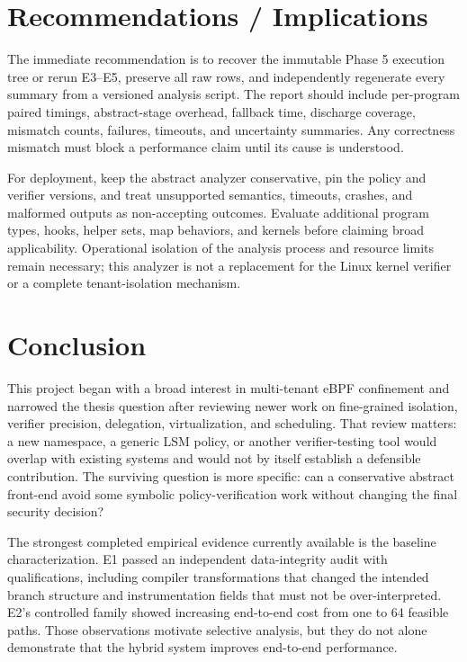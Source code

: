 \documentclass[12pt,a4paper]{article}
\begin{document}


\section{Recommendations / Implications}
The immediate recommendation is to recover the immutable Phase 5 execution tree or rerun E3--E5, preserve all raw rows, and independently regenerate every summary from a versioned analysis script. The report should include per-program paired timings, abstract-stage overhead, fallback time, discharge coverage, mismatch counts, failures, timeouts, and uncertainty summaries. Any correctness mismatch must block a performance claim until its cause is understood.

For deployment, keep the abstract analyzer conservative, pin the policy and verifier versions, and treat unsupported semantics, timeouts, crashes, and malformed outputs as non-accepting outcomes. Evaluate additional program types, hooks, helper sets, map behaviors, and kernels before claiming broad applicability. Operational isolation of the analysis process and resource limits remain necessary; this analyzer is not a replacement for the Linux kernel verifier or a complete tenant-isolation mechanism.

\section{Conclusion}

This project began with a broad interest in multi-tenant eBPF confinement and narrowed the thesis question after reviewing newer work on fine-grained isolation, verifier precision, delegation, virtualization, and scheduling. That review matters: a new namespace, a generic LSM policy, or another verifier-testing tool would overlap with existing systems and would not by itself establish a defensible contribution. The surviving question is more specific: can a conservative abstract front-end avoid some symbolic policy-verification work without changing the final security decision?

The strongest completed empirical evidence currently available is the baseline characterization. E1 passed an independent data-integrity audit with qualifications, including compiler transformations that changed the intended branch structure and instrumentation fields that must not be over-interpreted. E2's controlled family showed increasing end-to-end cost from one to 64 feasible paths. Those observations motivate selective analysis, but they do not alone demonstrate that the hybrid system improves end-to-end performance.
\end{document}
